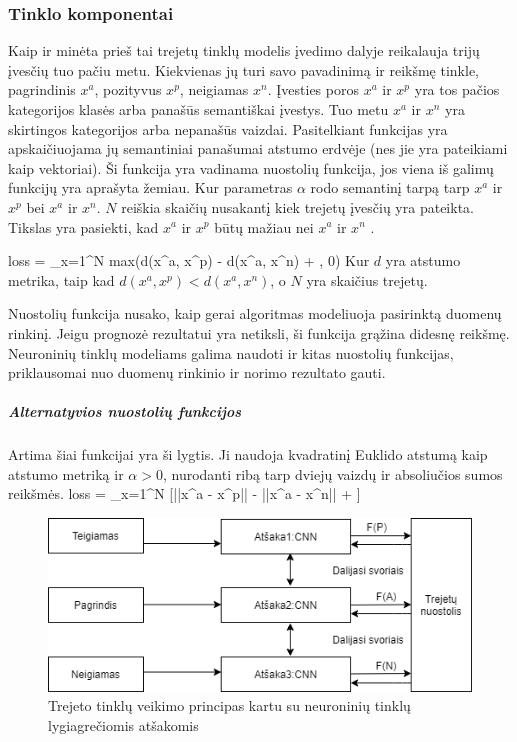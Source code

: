 \documentclass{VUMIFPSkursinis}
\let\[\relax \let\]\relax %
\DeclareRobustCommand{\[}{\begin{equation}}
\DeclareRobustCommand{\]}{\end{equation}}
\begin{document}
\subsubsection{Tinklo komponentai}
Kaip ir minėta prieš tai trejetų tinklų modelis įvedimo dalyje reikalauja trijų įvesčių tuo pačiu metu. Kiekvienas jų turi savo pavadinimą ir reikšmę tinkle, pagrindinis $x^a$, pozityvus $x^p$, neigiamas $x^n$. Įvesties poros $x^a$ ir $x^p$ yra tos pačios kategorijos klasės arba panašūs semantiškai įvestys. Tuo metu $x^a$ ir $x^n$ yra skirtingos kategorijos arba nepanašūs vaizdai. Pasitelkiant funkcijas yra apskaičiuojama jų semantiniai panašumai atstumo erdvėje (nes jie yra pateikiami kaip vektoriai). Ši funkcija yra vadinama nuostolių funkcija, jos viena iš galimų funkcijų yra aprašyta žemiau. Kur parametras $\alpha$ rodo semantinį tarpą tarp $x^a$ ir $x^p$ bei $x^a$ ir $x^n$. $N$ reiškia skaičių nusakantį kiek trejetų įvesčių yra pateikta. Tikslas yra pasiekti, kad $x^a$ ir $x^p$ būtų mažiau nei $x^a$ ir $x^n$ \cite{Face_recognition}.

\[loss = \sum_{x=1}^{N} max(d(x^a, x^p) - d(x^a, x^n) + \alpha, 0)\]
Kur $d$ yra atstumo metrika, taip kad $d(x^a, x^p) < d(x^a, x^n)$, o $N$ yra skaičius trejetų.

Nuostolių funkcija nusako, kaip gerai algoritmas modeliuoja pasirinktą duomenų rinkinį. Jeigu prognozė rezultatui yra netiksli, ši funkcija grąžina didesnę reikšmę. Neuroninių tinklų modeliams galima naudoti ir kitas nuostolių funkcijas, priklausomai nuo duomenų rinkinio ir norimo rezultato gauti.

\subparagraph{Alternatyvios nuostolių funkcijos}
Artima šiai funkcijai yra ši lygtis. Ji naudoja kvadratinį Euklido  \cite{Aerial_image_similarity} atstumą kaip atstumo metriką ir $\alpha > 0$, nurodanti ribą tarp dviejų vaizdų ir absoliučios sumos reikšmės.
\[loss = \sum_{x=1}^{N} [||x^a - x^p|| - ||x^a - x^n|| + \alpha]\]

\begin{figure}[H]
\centering
\includegraphics[scale=0.8]{img/Triplet_network_branchCNN}
\caption{Trejeto tinklų veikimo principas kartu su neuroninių tinklų lygiagrečiomis atšakomis} %
\label{img:mlp}
\end{figure}
\end{document}
